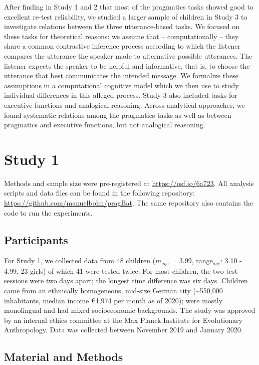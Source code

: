 \documentclass[
  english,
  man,floatsintext]{apa6}
\begin{document}
After finding in Study 1 and 2 that most of the pragmatics tasks showed good to excellent re-test reliability, we studied a larger sample of children in Study 3 to investigate relations between the three utterance-based tasks. We focused on these tasks for theoretical reasons: we assume that -- computationally -- they share a common contrastive inference process according to which the listener compares the utterance the speaker made to alternative possible utterances. The listener expects the speaker to be helpful and informative, that is, to choose the utterance that best communicates the intended message. We formalize these assumptions in a computational cognitive model which we then use to study individual differences in this alleged process. Study 3 also included tasks for executive functions and analogical reasoning. Across analytical approaches, we found systematic relations among the pragmatics tasks as well as between pragmatics and executive functions, but not analogical reasoning.

\hypertarget{study-1}{%
\section{Study 1}\label{study-1}}

Methods and sample size were pre-registered at \url{https://osf.io/6a723}. All analysis scripts and data files can be found in the following repository: \url{https://github.com/manuelbohn/pragBat}. The same repository also contains the code to run the experiments.

\hypertarget{participants}{%
\subsection{Participants}\label{participants}}

For Study 1, we collected data from 48 children (\(m_{age}\) = 3.99, range\(_{age}\): 3.10 - 4.99, 23 girls) of which 41 were tested twice. For most children, the two test sessions were two days apart; the longest time difference was six days. Children came from an ethnically homogeneous, mid-size German city (\textasciitilde550,000 inhabitants, median income €1,974 per month as of 2020); were mostly monolingual and had mixed socioeconomic backgrounds. The study was approved by an internal ethics committee at the Max Planck Institute for Evolutionary Anthropology. Data was collected between November 2019 and January 2020.

\hypertarget{material-and-methods}{%
\subsection{Material and Methods}\label{material-and-methods}}
\end{document}
